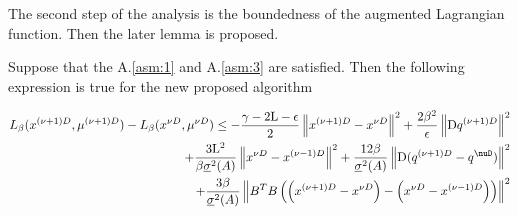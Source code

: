     The second step of the analysis is the boundedness of the augmented Lagrangian function. Then the later lemma is proposed.
    \begin{lemma}\label{lem:3.2}
        Suppose that the A.\ref{asm:1} and A.\ref{asm:3} are satisfied. Then the following expression is true for the new proposed algorithm

        \begin{equation}\label{eq:3.2.4}
            \begin{align}
                L_{\beta}(x^{(\nu + 1)D}, \mu^{(\nu + 1)D}) - L_{\beta}(x^{\nu D}, \mu^{\nu D}) \leq -\frac{\gamma - 2\mathrm{L} - \epsilon}{2} \left \lVert x^{(\nu + 1)D} - x^{\nu D}\right \rVert^2 + \frac{2 \beta^2}{\epsilon}\left \lVert \mathrm{D}q^{(\nu+1)D}\right \rVert^2\\ 
                + \frac{3\mathrm{L}^2}{\beta \underline{\sigma}^2(A)}\left \lVert x^{\nu D} - x^{(\nu -1 )D}\right \rVert^2 + \frac{12 \beta}{\underline{\sigma}^2(A)}\left \lVert \mathrm{D}(q^{(\nu+1)D}-q^{\nuD})\right \rVert^2\\
                +\frac{3 \beta}{\underline{\sigma}^2(A)}\left \lVert B^TB\left(\left(x^{(\nu+1)D}-x^{\nu D}\right)-\left(x^{\nu D} - x^{(\nu - 1)D}\right)\right)\right \rVert^2
            \end{align}
        \end{equation}
    \end{lemma}
